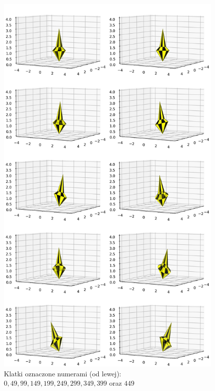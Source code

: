 \documentclass[a4paper,twoside,11pt,reqno]{mwrep}
\theoremstyle{plain} \newtheorem{twr}{Twierdzenie}
\theoremstyle{plain} \newtheorem{lem}{Lemat}
\theoremstyle{definition} \newtheorem{defi}{Definicja}
\theoremstyle{remark} \newtheorem*{wni}{Wniosek}
\theoremstyle{definition} \newtheorem{uwaga}{Uwaga}
\theoremstyle{definition}\newtheorem{prz}{Przykład}
\begin{document}
\begin{figure}

\begin{center}
\includegraphics[width=14 cm]{Merged_quaternion.png}
\caption{Klatki oznaczone numerami (od lewej): $0,49,99,149,199,249,299,349,399$ oraz $449$}
\end{center}

\end{figure}
\newpage
$\left.\right.$
\end{document}
